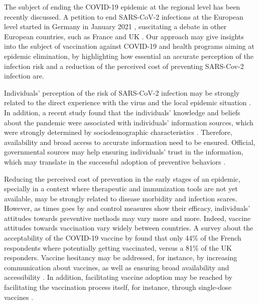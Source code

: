 The subject of ending the COVID-19 epidemic at the regional level has been recently discussed. A petition to end SARS-CoV-2 infections at the European level started in Germany in January 2021 \cite[]{ZeroCovid_EU}, suscitating a debate in other European countries, such as France \cite[]{ZeroCovid_FR} and UK \cite[]{ZeroCovid_UK}. Our approach may give  insights into the subject of vaccination against COVID-19 and health programs aiming at epidemic elimination, by highlighting how essential an accurate perception of the infection risk and a reduction of the perceived cost of preventing SARS-Cov-2 infection are. 

Individuals' perception of the risk of SARS-CoV-2 infection may be strongly related to the direct experience with the virus and the local epidemic situation \cite[]{Mansilla2020,Elharake2021}. In addition, a recent study found that the individuals' knowledge and beliefs about the pandemic were associated with individuals' information sources, which were strongly determined by sociodemographic characteristics \cite[]{Ali2020}. Therefore, availability and broad access to accurate information need to be ensured. Official, governmental sources may help ensuring  individuals' trust in the information, which may translate in the successful adoption of preventive behaviors \cite[]{Lim2020}.

Reducing the perceived cost of prevention in the early stages of an epidemic, specially in a context where therapeutic and immunization tools are not yet available, may be strongly related to disease morbidity and infection scares. However, as times goes by and control measures show their efficacy, individuals' attitudes towards preventive methods may vary more and more. Indeed, vaccine attitudes towards vaccination vary widely between countries. A survey about the acceptability of the COVID-19 vaccine by \cite{Wuoters2021} found that only 44\% of the French respondents where potentially getting vaccinated, versus a 81\% of the UK responders. Vaccine hesitancy may be addressed, for instance, by increasing communication about vaccines, as well as ensuring broad availability and accessibility \cite[]{Wuoters2021}. In addition, facilitating vaccine adoption may be reached by facilitating the vaccination process itself, for instance, through single-dose vaccines \cite[]{SanchezFelipe2020}.%


